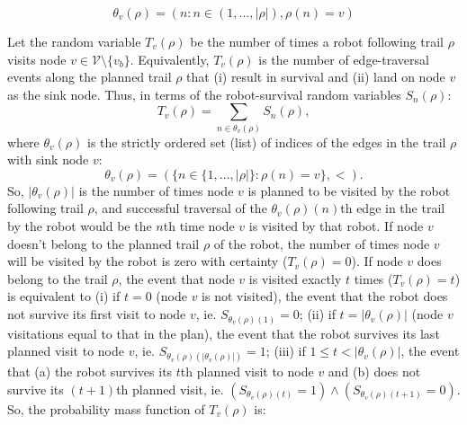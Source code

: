 \documentclass[11pt, oneside]{article}
\begin{document}
\begin{equation}
	\theta_v(\rho) = (n : n \in (1, ..., \lvert \rho \rvert) ,  \rho(n) = v)
\end{equation}

Let the random variable $T_v(\rho)$ be the number of times a robot following trail $\rho$ visits node $v\in \mathcal{V} \setminus \{v_b\}$. 
Equivalently, $T_v(\rho)$ is the number of edge-traversal events along the planned trail $\rho$ that (i) result in survival and (ii) land on node $v$ as the sink node. 
Thus, in terms of the robot-survival random variables $S_n(\rho)$:
\begin{equation}
	T_v(\rho) = \sum_{n \in \theta_v(\rho) } S_n(\rho), %
\end{equation}
where $\theta_v(\rho)$ is the strictly ordered set (list) of indices of the edges in the trail $\rho$ with sink node $v$:
\begin{equation}
	\theta_v(\rho) = (\{ n \in \{1, ..., \lvert \rho \rvert\} : \rho(n) = v\}, <).
\end{equation} So, $\lvert \theta_v(\rho) \rvert$ is the number of times node $v$ is planned to be visited by the robot following trail $\rho$, and successful traversal of the $\theta_v(\rho)(n)$th edge in the trail by the robot would be the $n$th time node $v$ is visited by that robot.
If node $v$ doesn't belong to the planned trail $\rho$ of the robot, the number of times node $v$ will be visited by the robot is zero with certainty ($T_v(\rho)=0$).
If node $v$ does belong to the trail $\rho$, the event that node $v$ is visited exactly $t$ times ($T_v(\rho)=t$) is equivalent to
(i) if $t=0$ (node $v$ is not visited), the event that the robot does not survive its first visit to node $v$, ie. $S_{\theta_v(\rho)(1)}=0$;
(ii) if $t=\lvert \theta_v(\rho)\rvert$ (node $v$ visitations equal to that in the plan), the event that the robot survives its last planned visit to node $v$, ie. $S_{\theta_v(\rho)(\lvert \theta_v(\rho) \rvert)}=1$;
(iii) if $1 \leq t < \lvert \theta_v(\rho ) \rvert$, the event that (a) the robot survives its $t$th planned visit to node $v$ and (b) does not survive its $(t+1)$th planned visit, ie. $(S_{\theta_v(\rho)(t)}=1) \land (S_{\theta_v(\rho)(t+1)}=0)$. So, the probability mass function of $T_v(\rho)$ is:
\end{document}
